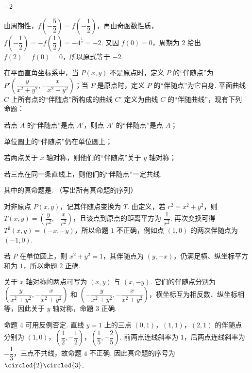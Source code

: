 \begin{answer}
\(-2\)
\end{answer}

\begin{solution}
由周期性，\(f\!\left(-\dfrac52\right)=f\!\left(-\dfrac12\right)\)，再由奇函数性质，\(f\!\left(-\dfrac12\right)=-f\!\left(\dfrac12\right)=-4^{\frac{1}{2}}=-2\). 又因 \(f(0)=0\)，周期为 \(2\) 给出 \(f(2)=f(0)=0\)，所以原式等于 \(-2\).
\end{solution}

\begin{problem}
在平面直角坐标系中，当 \(P(x,y)\) 不是原点时，定义 \(P\) 的“伴随点”为 \(P'\!\left( \dfrac{y}{x^2+y^2},-\dfrac{x}{x^2+y^2} \right)\)；当 \(P\) 是原点时，定义 \(P\) 的“伴随点”为它自身. 平面曲线 \(C\) 上所有点的“伴随点”所构成的曲线 \(C'\) 定义为曲线 \(C\) 的“伴随曲线”，现有下列命题：

\begin{circlelist}
\item 若点 \(A\) 的“伴随点”是点 \(A'\)，则点 \(A'\) 的“伴随点”是点 \(A\)；
\item 单位圆上的“伴随点”仍在单位圆上；
\item 若两点关于 \(x\) 轴对称，则他们的“伴随点”关于 \(y\) 轴对称；
\item 若三点在同一条直线上，则他们的“伴随点”一定共线.
\end{circlelist}

其中的真命题是\fillinblank{}. （写出所有真命题的序列）
\end{problem}

\begin{answer}
\end{answer}

\begin{solution}
对非原点 \(P(x,y)\)，记其伴随点变换为 \(T\). 由定义，若 \(r^2=x^2+y^2\)，则
\(T(x,y)=\left(\dfrac{y}{r^2},-\dfrac{x}{r^2}\right)\)，且该点到原点的距离平方为 \(\dfrac1{r^2}\). 再次变换可得 \(T^2(x,y)=(-x,-y)\)，所以命题 \(1\) 不正确，例如点 \((1,0)\) 的两次伴随点为 \((-1,0)\).

若 \(P\) 在单位圆上，则 \(x^2+y^2=1\)，其伴随点为 \((y,-x)\)，仍满足横、纵坐标平方和为 \(1\)，所以命题 \(2\) 正确.

关于 \(x\) 轴对称的两点可写为 \((x,y)\) 与 \((x,-y)\). 它们的伴随点分别为 \(\left(\dfrac{y}{x^2+y^2},-\dfrac{x}{x^2+y^2}\right)\) 和 \(\left(-\dfrac{y}{x^2+y^2},-\dfrac{x}{x^2+y^2}\right)\)，横坐标互为相反数、纵坐标相等，因此关于 \(y\) 轴对称，命题 \(3\) 正确.

命题 \(4\) 可用反例否定. 直线 \(y=1\) 上的三点 \((0,1)\)，\((1,1)\)，\((2,1)\) 的伴随点分别为 \((1,0)\)，\(\left(\dfrac12,-\dfrac12\right)\)，\(\left(\dfrac15,-\dfrac25\right)\). 前两点连线斜率为 \(1\)，后两点连线斜率为 \(-\dfrac13\)，三点不共线，故命题 \(4\) 不正确. 因此真命题的序号为 \(\circled{2}\circled{3}\).
\end{solution}

